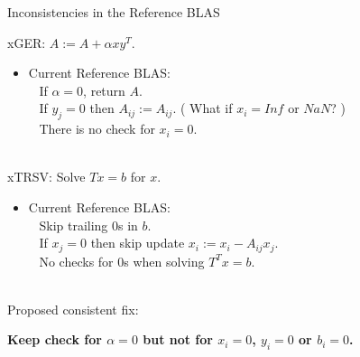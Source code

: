 \documentclass[11pt]{beamer}
\begin{document}
\begin{frame}{Inconsistencies in the Reference BLAS}

	xGER: $A := A + \alpha x y^T$.
	\begin{itemize}
		\item Current Reference BLAS:\\
		~ If $\alpha = 0$, return $A$.\\
		~ If $y_j = 0$ then $A_{ij} := A_{ij}$. ( What if $x_i = Inf$ or $NaN$? )\\
		~ There is no check for $x_i = 0$.
	\end{itemize}

	~\\
	xTRSV: Solve $Tx = b$ for $x$.
	\begin{itemize}
		\item Current Reference BLAS:\\
		~ Skip trailing 0s in $b$.\\
		~ If $x_j = 0$ then skip update $x_i := x_i - A_{ij}x_j$.\\
		~ No checks for 0s when solving $T^Tx = b$.
	\end{itemize}

	~\\
	Proposed consistent fix:
	\begin{center}
		\textbf{Keep check for $\alpha = 0$ but not for $x_i = 0$, $y_i = 0$ or $b_i = 0$.}
	\end{center}


\end{frame}
\end{document}
